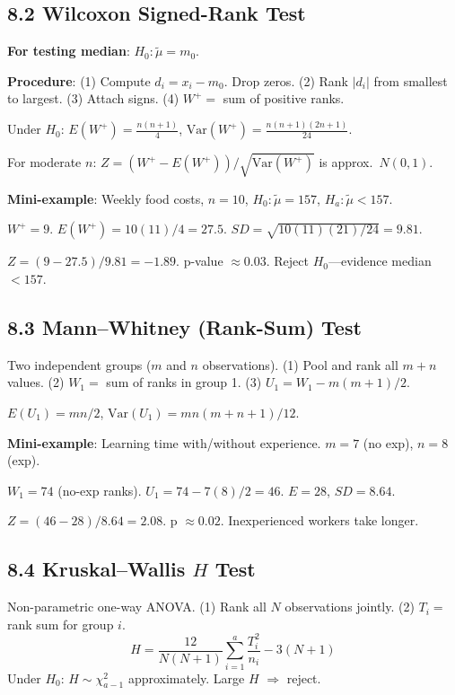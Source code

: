 \documentclass[9pt,letterpaper]{article}
\begin{document}
\subsection{8.2 Wilcoxon Signed-Rank Test}

\textbf{For testing median}: $H_0: \tilde\mu = m_0$.

\textbf{Procedure}: (1) Compute $d_i = x_i - m_0$. Drop zeros. (2) Rank $|d_i|$ from smallest to largest. (3) Attach signs. (4) $W^+ = $ sum of positive ranks.

Under $H_0$: $E(W^+) = \frac{n(n+1)}{4}$, \quad $\text{Var}(W^+) = \frac{n(n+1)(2n+1)}{24}$.

For moderate $n$: $Z = (W^+ - E(W^+))/\sqrt{\text{Var}(W^+)}$ is approx.\ $N(0,1)$.

\textbf{Mini-example}: Weekly food costs, $n=10$, $H_0:\tilde\mu=157$, $H_a:\tilde\mu<157$.

$W^+ = 9$. $E(W^+) = 10(11)/4 = 27.5$. $SD = \sqrt{10(11)(21)/24} = 9.81$.

$Z = (9-27.5)/9.81 = -1.89$. p-value $\approx 0.03$. Reject $H_0$---evidence median $< 157$.

\subsection{8.3 Mann--Whitney (Rank-Sum) Test}

Two independent groups ($m$ and $n$ observations). (1) Pool and rank all $m+n$ values. (2) $W_1 = $ sum of ranks in group 1. (3) $U_1 = W_1 - m(m+1)/2$.

$E(U_1) = mn/2$, \quad $\text{Var}(U_1) = mn(m+n+1)/12$.

\textbf{Mini-example}: Learning time with/without experience. $m=7$ (no exp), $n=8$ (exp).

$W_1 = 74$ (no-exp ranks). $U_1 = 74 - 7(8)/2 = 46$. $E=28$, $SD=8.64$.

$Z = (46-28)/8.64 = 2.08$. p $\approx 0.02$. Inexperienced workers take longer.

\subsection{8.4 Kruskal--Wallis $H$ Test}

Non-parametric one-way ANOVA. (1) Rank all $N$ observations jointly. (2) $T_i = $ rank sum for group $i$.
\[
H = \frac{12}{N(N+1)}\sum_{i=1}^{a}\frac{T_i^2}{n_i} - 3(N+1)
\]
Under $H_0$: $H \sim \chi^2_{a-1}$ approximately. Large $H$ $\Rightarrow$ reject.
\end{document}
